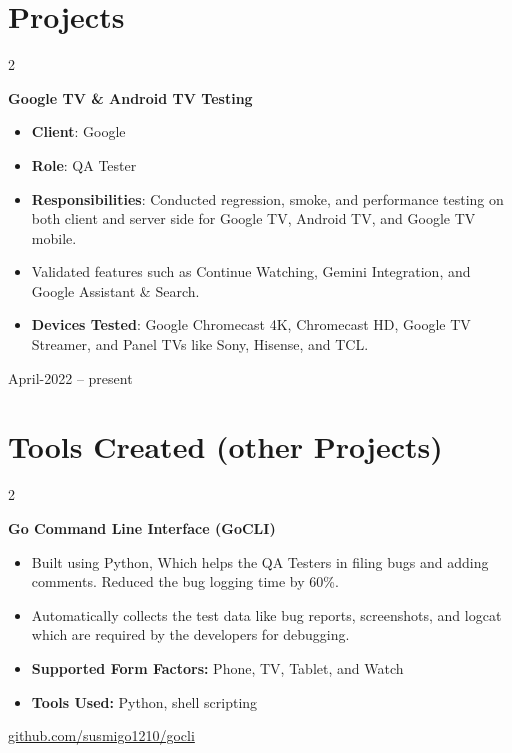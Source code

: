 \documentclass[10pt, letterpaper]{article}
\newenvironment{highlights}{
    \begin{itemize}[
        topsep=0.10 cm,
        parsep=0.10 cm,
        partopsep=0pt,
        itemsep=0pt,
        leftmargin=0.4 cm + 10pt
    ]
}{
    \end{itemize}
} %
\newenvironment{twocolentry}[2][]{
    \onecolentry
    \def\secondColumn{#2}
    \setcolumnwidth{\fill, 4.5 cm}
    \begin{paracol}{2}
}{
    \switchcolumn \raggedleft \secondColumn
    \end{paracol}
    \endonecolentry
} %
\begin{document}
    
    \section{Projects}



        
        \begin{twocolentry}{
            April-2022 -- present
        }
            \textbf{Google TV \& Android TV Testing}
            \begin{highlights}
                \item \textbf{Client}: Google
                \item \textbf{Role}: QA Tester
                \item \textbf{Responsibilities}: Conducted regression, smoke, and performance testing on both client and server side for Google TV, Android TV, and Google TV mobile.
                \item Validated features such as Continue Watching, Gemini Integration, and Google Assistant \& Search.
                \item \textbf{Devices Tested}: Google Chromecast 4K, Chromecast HD, Google TV Streamer, and Panel TVs like Sony, Hisense, and TCL.
            \end{highlights}
        \end{twocolentry}



    
    \section{Tools Created (other Projects)}



        
        \begin{twocolentry}{
            \href{https://susmigo1210.github.io/gocli_guide/}{github.com/susmigo1210/gocli}
        }
            \textbf{Go Command Line Interface (GoCLI)}
            \begin{highlights}
                \item Built using Python, Which helps the QA Testers in filing bugs and adding comments. Reduced the bug logging time by 60\%.
                \item Automatically collects the test data like bug reports, screenshots, and logcat which are required by the developers for debugging.
                \item \textbf{Supported Form Factors:} Phone, TV, Tablet, and Watch
                \item \textbf{Tools Used:} Python, shell scripting
            \end{highlights}
        \end{twocolentry}
\end{document}
